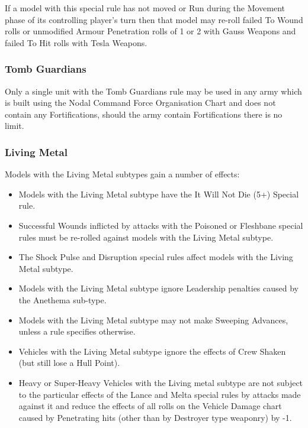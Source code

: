 \begin{multicols}{2}
If a model with this special rule has not moved or Run during the Movement phase of its controlling player’s turn then that model may re-roll failed To Wound rolls or unmodified Armour Penetration rolls of 1 or 2 with Gauss Weapons and failed To Hit rolls with Tesla Weapons.

\subsubsection{Tomb Guardians} \label{Tomb Guardians}

Only a single unit with the Tomb Guardians rule may be used in any army which is built using the Nodal Command Force Organisation Chart and does not contain any Fortifications, should the army contain Fortifications there is no limit.

\end{multicols}


\subsubsection{Living Metal} \label{Living Metal}

Models with the Living Metal subtypes gain a number of effects:

\begin{itemize}
	\item Models with the Living Metal subtype have the It Will Not Die (5+) Special rule.
	\item Successful Wounds inflicted by attacks with the Poisoned or Fleshbane special rules must be re-rolled against models with the Living Metal subtype.
	\item The Shock Pulse and Disruption special rules affect models with the Living Metal subtype.
	\item Models with the Living Metal subtype ignore Leadership penalties caused by the Anethema sub-type.
	\item Models with the Living Metal subtype may not make Sweeping Advances, unless a rule specifies otherwise.
\end{itemize} 

\begin{itemize}
	\item Vehicles with the Living Metal subtype ignore the effects of Crew Shaken (but still lose a Hull Point).
	\item Heavy or Super-Heavy Vehicles with the Living metal subtype are not subject to the particular effects of the Lance and Melta special rules by attacks made against it and reduce the effects of all rolls on the Vehicle Damage chart caused by Penetrating hits (other than by Destroyer type weaponry) by -1.
\end{itemize} 

